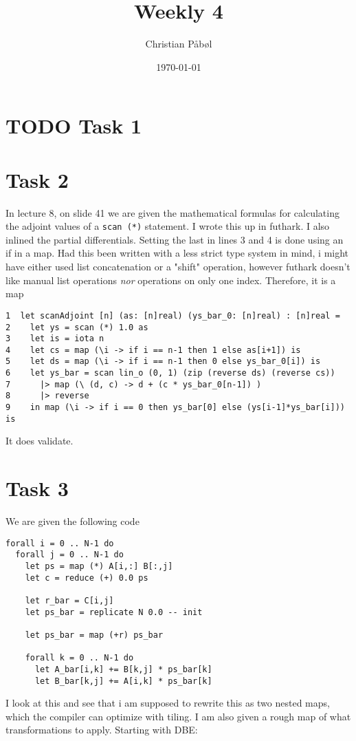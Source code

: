 \documentclass[11pt]{article}
\author{Christian Påbøl}
\date{\today}
\title{Weekly 4}
\begin{document}
\maketitle
\tableofcontents

\section{{\bfseries\sffamily TODO} Task 1}
\label{sec:orgbd126b1}
\section{Task 2}
\label{sec:orgadc6425}
In lecture 8, on slide 41 we are given the mathematical formulas for
calculating the adjoint values of a \texttt{scan (*)} statement. I wrote this
up in futhark. I also inlined the partial differentials. Setting the
last in lines 3 and 4 is done using an if in a map. Had this been written
with a less strict type system in mind, i might have either used list
concatenation or a "shift" operation, however futhark doesn't like manual
list operations \emph{nor} operations on only one index. Therefore, it is a
map
\begin{verbatim}
1  let scanAdjoint [n] (as: [n]real) (ys_bar_0: [n]real) : [n]real =
2    let ys = scan (*) 1.0 as
3    let is = iota n
4    let cs = map (\i -> if i == n-1 then 1 else as[i+1]) is
5    let ds = map (\i -> if i == n-1 then 0 else ys_bar_0[i]) is
6    let ys_bar = scan lin_o (0, 1) (zip (reverse ds) (reverse cs))
7      |> map (\ (d, c) -> d + (c * ys_bar_0[n-1]) )
8      |> reverse
9    in map (\i -> if i == 0 then ys_bar[0] else (ys[i-1]*ys_bar[i])) is
\end{verbatim}
It does validate.

\section{Task 3}
\label{sec:org9f0d3cf}

We are given the following code
\begin{verbatim}
forall i = 0 .. N-1 do
  forall j = 0 .. N-1 do
    let ps = map (*) A[i,:] B[:,j]
    let c = reduce (+) 0.0 ps

    let r_bar = C[i,j]
    let ps_bar = replicate N 0.0 -- init

    let ps_bar = map (+r) ps_bar

    forall k = 0 .. N-1 do
      let A_bar[i,k] += B[k,j] * ps_bar[k]
      let B_bar[k,j] += A[i,k] * ps_bar[k]
\end{verbatim}
I look at this and see that i am supposed to rewrite this as two nested
maps, which the compiler can optimize with tiling. I am also given a
rough map of what transformations to apply. Starting with DBE:  
\end{document}
